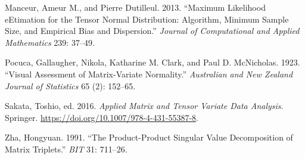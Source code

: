\documentclass[
  12pt,
  letterpaper,
  DIV=11,
  numbers=noendperiod]{scrartcl}
\newlength{\cslhangindent}
\newenvironment{CSLReferences}[2] %
 {\begin{list}{}{%
  \setlength{\itemindent}{0pt}
  \setlength{\leftmargin}{0pt}
  \setlength{\parsep}{0pt}
  \ifodd #1
   \setlength{\leftmargin}{\cslhangindent}
   \setlength{\itemindent}{-1\cslhangindent}
  \fi
  \setlength{\itemsep}{#2\baselineskip}}}
 {\end{list}}
\begin{document}
\begin{CSLReferences}{1}{1}
Manceur, Ameur M., and Pierre Dutilleul. 2013. {``Maximum Likelihood
eEtimation for the Tensor Normal Distribution: Algorithm, Minimum Sample
Size, and Empirical Bias and Dispersion.''} \emph{Journal of
Computational and Applied Mathematics} 239: 37--49.

Pocuca, Gallaugher, Nikola, Katharine M. Clark, and Paul D. McNicholas.
1923. {``Visual Assessment of Matrix-Variate Normality.''}
\emph{{Australian and New Zealand Journal of Statistics}} 65 (2):
152--65.

Sakata, Toshio, ed. 2016. \emph{Applied Matrix and Tensor Variate Data
Analysis}. Springer. \url{https://doi.org/10.1007/978-4-431-55387-8}.

Zha, Hongyuan. 1991. {``The Product-Product Singular Value Decomposition
of Matrix Triplets.''} \emph{BIT} 31: 711--26.

\end{CSLReferences}
\end{document}
